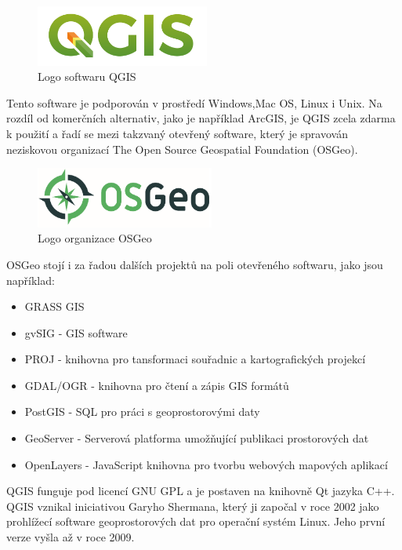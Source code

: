 \documentclass[a4paper,oneside,12pt]{book}
\begin{document}
\begin{figure}[ht] \label{obr2}
\centering
\includegraphics[height=2cm]{pictures/qgis-logo.png}
\caption{Logo softwaru QGIS}
\label{fig:QGIS}
\end{figure}

\hspace{10mm} Tento software je podporován v prostředí Windows,Mac OS, Linux i Unix. Na rozdíl od komerčních alternativ, jako je například ArcGIS, je QGIS zcela zdarma k použití a řadí se mezi takzvaný otevřený software, který je spravován neziskovou organizací The Open Source Geospatial Foundation (OSGeo).

\begin{figure}[ht] \label{obr3}
\centering
\includegraphics[height=2cm]{pictures/Osgeo.png}
\caption{ Logo organizace OSGeo}
\label{fig:OSGEO}
\end{figure}

\hspace{10mm} OSGeo stojí i za řadou dalších projektů na poli otevřeného softwaru, jako jsou například:
\begin{itemize}
\item GRASS GIS 
\item gvSIG - GIS software
\item PROJ - knihovna pro tansformaci souřadnic a kartografických projekcí
\item GDAL/OGR - knihovna pro čtení a zápis GIS formátů
\item PostGIS - SQL pro práci s geoprostorovými daty
\item GeoServer - Serverová platforma umožňující publikaci prostorových dat 
\item OpenLayers - JavaScript knihovna pro tvorbu webových mapových aplikací
\end{itemize}


\hspace{10mm} QGIS funguje pod licencí GNU GPL a je postaven na knihovně Qt jazyka C++. QGIS vznikal iniciativou Garyho Shermana, který ji započal v roce 2002 jako prohlížecí software geoprostorových dat pro operační systém Linux. Jeho první verze vyšla až v roce 2009. \cite{Matejova2019}
\end{document}
